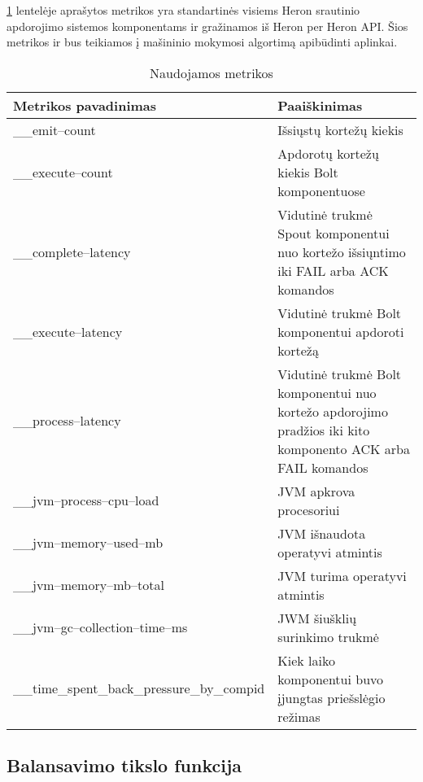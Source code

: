 \documentclass{VUMIFPSbakalaurinis}
\begin{document}
\ref{metrics–table} lentelėje aprašytos metrikos yra standartinės visiems Heron srautinio apdorojimo sistemos komponentams ir gražinamos iš Heron per Heron API. Šios metrikos ir bus teikiamos į mašininio mokymosi algortimą apibūdinti aplinkai.

\begin{longtable}{|p{0.5\linewidth}|p{0.5\linewidth}|}
    \caption{Naudojamos metrikos}
    \label{metrics–table}\\
    \hline
    \rowcolor[HTML]{C0C0C0} 
    Metrikos pavadinimas                                  & Paaiškinimas            \\ \hline
    \endfirsthead
    \endhead
    \_\_emit–count                                        & Išsiųstų kortežų kiekis                    \\ \hline
    \_\_execute–count                                     & Apdorotų kortežų kiekis Bolt komponentuose \\ \hline
    \_\_complete–latency                                  & Vidutinė trukmė Spout komponentui nuo kortežo išsiųntimo iki FAIL arba ACK komandos \\ \hline
    \_\_execute–latency                                   & Vidutinė trukmė Bolt komponentui apdoroti kortežą                                          \\ \hline
    \_\_process–latency                                   & Vidutinė trukmė Bolt komponentui nuo kortežo apdorojimo pradžios iki kito komponento ACK arba FAIL komandos \\ \hline
    \_\_jvm–process–cpu–load                              & JVM apkrova procesoriui     \\ \hline
    \_\_jvm–memory–used–mb                                & JVM išnaudota operatyvi atmintis       \\ \hline
    \_\_jvm–memory–mb–total                               & JVM turima operatyvi atmintis    \\ \hline
    \_\_jvm–gc–collection–time–ms                         & JWM šiušklių surinkimo trukmė     \\ \hline
    \_\_time\_spent\_back\_pressure\_by\_compid           & Kiek laiko komponentui buvo įjungtas priešslėgio režimas  \\ \hline
\end{longtable}

\subsection{Balansavimo tikslo funkcija}
\end{document}

